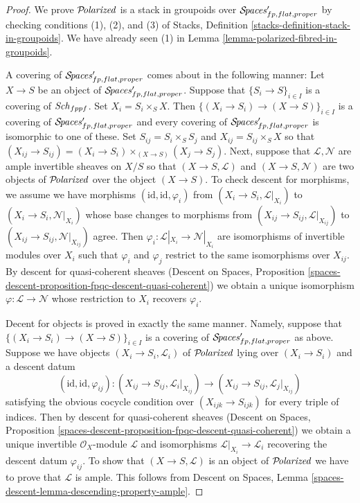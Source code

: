\begin{proof}
We prove $\mathcal{P}\!\mathit{olarized}$ is a stack in groupoids over
$\mathcal{S}\!\mathit{paces}'_{fp, flat, proper}$
by checking conditions (1), (2), and (3)
of Stacks, Definition \ref{stacks-definition-stack-in-groupoids}.
We have already seen (1) in
Lemma \ref{lemma-polarized-fibred-in-groupoids}.

\medskip\noindent
A covering of $\mathcal{S}\!\mathit{paces}'_{fp, flat, proper}$ comes about
in the following manner: Let $X \to S$ be an object of
$\mathcal{S}\!\mathit{paces}'_{fp, flat, proper}$. Suppose that
$\{S_i \to S\}_{i \in I}$ is a covering of $\mathit{Sch}_{fppf}$.
Set $X_i = S_i \times_S X$. Then $\{(X_i \to S_i) \to (X \to S)\}_{i \in I}$
is a covering of $\mathcal{S}\!\mathit{paces}'_{fp, flat, proper}$ and
every covering of $\mathcal{S}\!\mathit{paces}'_{fp, flat, proper}$ is isomorphic
to one of these. Set $S_{ij} = S_i \times_S S_j$ and
$X_{ij} = S_{ij} \times_S X$ so that $(X_{ij} \to S_{ij}) =
(X_i \to S_i) \times_{(X \to S)} (X_j \to S_j)$.
Next, suppose that $\mathcal{L}, \mathcal{N}$
are ample invertible sheaves on $X/S$ so that
$(X \to S, \mathcal{L})$ and $(X \to S, \mathcal{N})$
are two objects of $\mathcal{P}\!\mathit{olarized}$ over the object $(X \to S)$.
To check descent for morphisms, we assume we have morphisms
$(\text{id}, \text{id}, \varphi_i)$ from
$(X_i \to S_i, \mathcal{L}|_{X_i})$ to
$(X_i \to S_i, \mathcal{N}|_{X_i})$
whose base changes to morphisms from
$(X_{ij} \to S_{ij}, \mathcal{L}|_{X_{ij}})$ to
$(X_{ij} \to S_{ij}, \mathcal{N}|_{X_{ij}})$
agree. Then
$\varphi_i : \mathcal{L}|_{X_i} \to \mathcal{N}|_{X_i}$
are isomorphisms of invertible modules over $X_i$ such that
$\varphi_i$ and $\varphi_j$ restrict to the same
isomorphisms over $X_{ij}$.
By descent for quasi-coherent sheaves
(Descent on Spaces, Proposition
\ref{spaces-descent-proposition-fpqc-descent-quasi-coherent})
we obtain a unique isomorphism $\varphi : \mathcal{L} \to \mathcal{N}$
whose restriction to $X_i$ recovers $\varphi_i$.

\medskip\noindent
Decent for objects is proved in exactly the same manner.
Namely, suppose that
$\{(X_i \to S_i) \to (X \to S)\}_{i \in I}$
is a covering of $\mathcal{S}\!\mathit{paces}'_{fp, flat, proper}$
as above.
Suppose we have objects $(X_i \to S_i, \mathcal{L}_i)$
of $\mathcal{P}\!\mathit{olarized}$ lying over $(X_i \to S_i)$
and a descent datum
$$
(\text{id}, \text{id}, \varphi_{ij}) :
(X_{ij} \to S_{ij}, \mathcal{L}_i|_{X_{ij}})
\to
(X_{ij} \to S_{ij}, \mathcal{L}_j|_{X_{ij}})
$$
satisfying the obvious cocycle condition over
$(X_{ijk} \to S_{ijk})$ for every triple of indices.
Then by
 descent for quasi-coherent sheaves
(Descent on Spaces, Proposition
\ref{spaces-descent-proposition-fpqc-descent-quasi-coherent})
we obtain a unique invertible $\mathcal{O}_X$-module
$\mathcal{L}$ and isomorphisms $\mathcal{L}|_{X_i} \to \mathcal{L}_i$
recovering the descent datum $\varphi_{ij}$.
To show that
$(X \to S, \mathcal{L})$ is an object of
$\mathcal{P}\!\mathit{olarized}$ we have to prove that
$\mathcal{L}$ is ample. This follows from
Descent on Spaces, Lemma \ref{spaces-descent-lemma-descending-property-ample}.


\end{proof}
